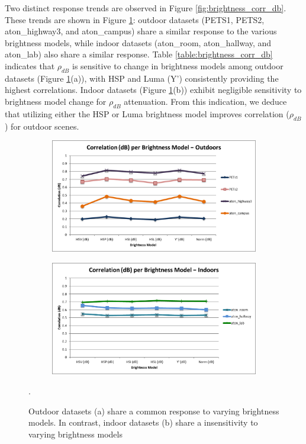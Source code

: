 Two distinct response trends are observed in Figure \ref{fig:brightness_corr_db}. These trends are shown in Figure \ref{fig:brightness_indoor_outdoor_db}: outdoor datasets (PETS1, PETS2, aton\_highway3, and aton\_campus) share a similar response to the various brightness models, while indoor datasets (aton\_room, aton\_hallway, and aton\_lab) also share a similar response. Table \ref{table:brightness_corr_db} indicates that $\rho_{dB}$ is sensitive to change in brightness models among outdoor datasets (Figure \ref{fig:brightness_indoor_outdoor_db}(a)), with HSP and Luma (Y') consistently providing the highest correlations. Indoor datasets (Figure \ref{fig:brightness_indoor_outdoor_db}(b)) exhibit negligible sensitivity to brightness model change for $\rho_{dB}$ attenuation. From this indication, we deduce that utilizing either the HSP or Luma brightness model improves correlation ($\rho_{dB}$) for outdoor scenes.

\begin{figure}
\centering
\begin{subfigure}{.8\linewidth}
  \includegraphics[width=1\linewidth]{figures/correlation_outdoors_db.jpg}
  \caption{}
\end{subfigure}
\hfill
\begin{subfigure}{.8\linewidth}
  \includegraphics[width=1\linewidth]{figures/correlation_indoors_db.jpg}
  \caption{}
\end{subfigure}

\caption{Outdoor datasets (a) share a common response to varying brightness models. In contrast, indoor datasets (b) share a insensitivity to varying brightness models}.
\label{fig:brightness_indoor_outdoor_db}
\end{figure}

